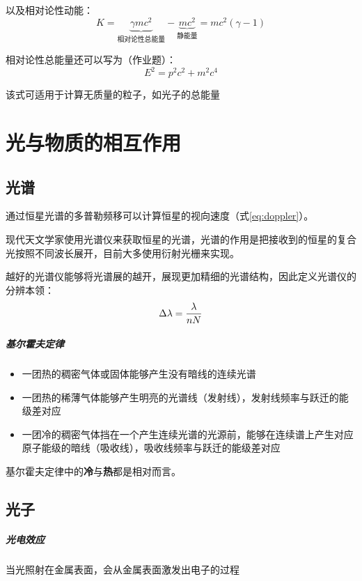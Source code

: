 \documentclass[openany]{ctexbook}
\begin{document}
以及相对论性动能：
\begin{equation}
  K=\underbrace{ \gamma mc^2}_\text{相对论性总能量}-\underbrace{mc^2}_\text{静能量}=mc^2(\gamma-1)
\end{equation}

相对论性总能量还可以写为（作业题）：
\begin{equation}
  E^2=p^2c^2+m^2c^4
\end{equation}

该式可适用于计算无质量的粒子，如光子的总能量

\chapter{光与物质的相互作用}
\section{光谱}
通过恒星光谱的多普勒频移可以计算恒星的视向速度（式\ref{eq:doppler}）。

现代天文学家使用光谱仪来获取恒星的光谱，光谱的作用是把接收到的恒星的复合光按照不同波长展开，目前大多使用衍射光栅来实现。

越好的光谱仪能够将光谱展的越开，展现更加精细的光谱结构，因此定义光谱仪的分辨本领：
\begin{equation}
  \Delta\lambda={\lambda \over nN}
\end{equation}

\paragraph{基尔霍夫定律}\label{kirchhoffs}
\begin{itemize}
  \item 一团热的稠密气体或固体能够产生没有暗线的连续光谱
  \item 一团热的稀薄气体能够产生明亮的光谱线（发射线），发射线频率与跃迁的能级差对应
  \item 一团冷的稠密气体挡在一个产生连续光谱的光源前，能够在连续谱上产生对应原子能级的暗线（吸收线），吸收线频率与跃迁的能级差对应
\end{itemize}

基尔霍夫定律中的\textbf{冷}与\textbf{热}都是相对而言。

\section{光子}
\paragraph{光电效应}
当光照射在金属表面，会从金属表面激发出电子的过程
\end{document}
